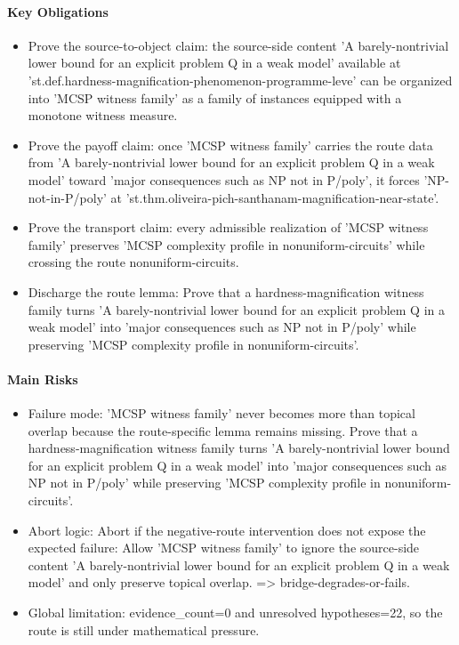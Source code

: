 \documentclass[11pt]{article}
\begin{document}
\paragraph{Key Obligations}
\begin{itemize}[leftmargin=*,itemsep=0.2em]
\item Prove the source-to-object claim: the source-side content 'A barely-nontrivial lower bound for an explicit problem Q in a weak model' available at 'st.def.hardness-magnification-phenomenon-programme-leve' can be organized into 'MCSP witness family' as a family of instances equipped with a monotone witness measure.
\item Prove the payoff claim: once 'MCSP witness family' carries the route data from 'A barely-nontrivial lower bound for an explicit problem Q in a weak model' toward 'major consequences such as NP not in P/poly', it forces 'NP-not-in-P/poly' at 'st.thm.oliveira-pich-santhanam-magnification-near-state'.
\item Prove the transport claim: every admissible realization of 'MCSP witness family' preserves 'MCSP complexity profile in nonuniform-circuits' while crossing the route nonuniform-circuits.
\item Discharge the route lemma: Prove that a hardness-magnification witness family turns 'A barely-nontrivial lower bound for an explicit problem Q in a weak model' into 'major consequences such as NP not in P/poly' while preserving 'MCSP complexity profile in nonuniform-circuits'.
\end{itemize}
\paragraph{Main Risks}
\begin{itemize}[leftmargin=*,itemsep=0.2em]
\item Failure mode: 'MCSP witness family' never becomes more than topical overlap because the route-specific lemma remains missing. Prove that a hardness-magnification witness family turns 'A barely-nontrivial lower bound for an explicit problem Q in a weak model' into 'major consequences such as NP not in P/poly' while preserving 'MCSP complexity profile in nonuniform-circuits'.
\item Abort logic: Abort if the negative-route intervention does not expose the expected failure: Allow 'MCSP witness family' to ignore the source-side content 'A barely-nontrivial lower bound for an explicit problem Q in a weak model' and only preserve topical overlap. => bridge-degrades-or-fails.
\item Global limitation: evidence\_count=0 and unresolved hypotheses=22, so the route is still under mathematical pressure.
\end{itemize}
\end{document}
